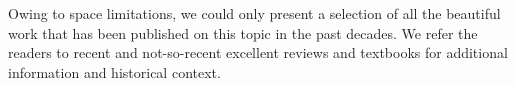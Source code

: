 Owing to space limitations, we could only present a selection of all
the beautiful work that has been published on this topic in the past
decades. We refer the readers to recent
\citep{Bar10,Ell10,Tre10,TMC12,Jackson:2013p30763,Jac15,T+E15} and not-so-recent \citep{B+N92,CSS02,K+S04,Fal05,SKW06}
excellent reviews and textbooks \citep{SEF92} for additional
information and historical context.  
